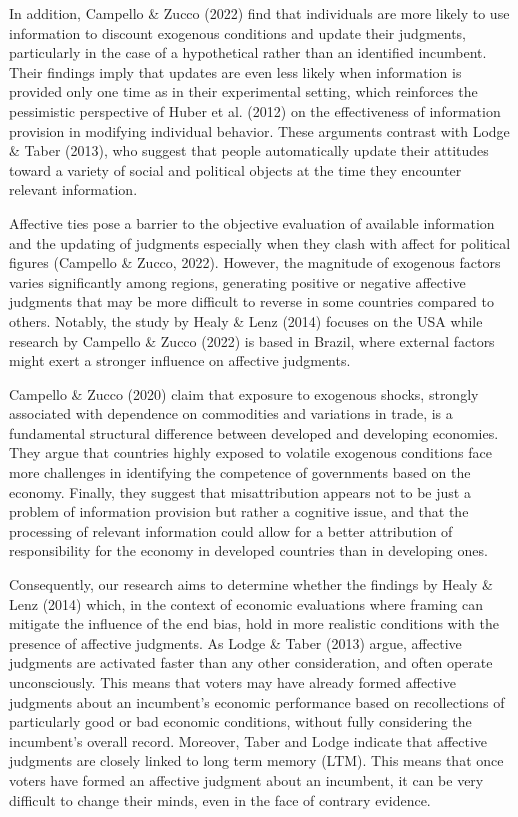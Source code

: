 \documentclass[
]{article}
\begin{document}
In addition, Campello \& Zucco (2022) find that individuals are more
likely to use information to discount exogenous conditions and update
their judgments, particularly in the case of a hypothetical rather than
an identified incumbent. Their findings imply that updates are even less
likely when information is provided only one time as in their
experimental setting, which reinforces the pessimistic perspective of
Huber et al. (2012) on the effectiveness of information provision in
modifying individual behavior. These arguments contrast with Lodge \&
Taber (2013), who suggest that people automatically update their
attitudes toward a variety of social and political objects at the time
they encounter relevant information.

Affective ties pose a barrier to the objective evaluation of available
information and the updating of judgments especially when they clash
with affect for political figures (Campello \& Zucco, 2022). However,
the magnitude of exogenous factors varies significantly among regions,
generating positive or negative affective judgments that may be more
difficult to reverse in some countries compared to others. Notably, the
study by Healy \& Lenz (2014) focuses on the USA while research by
Campello \& Zucco (2022) is based in Brazil, where external factors
might exert a stronger influence on affective judgments.

Campello \& Zucco (2020) claim that exposure to exogenous shocks,
strongly associated with dependence on commodities and variations in
trade, is a fundamental structural difference between developed and
developing economies. They argue that countries highly exposed to
volatile exogenous conditions face more challenges in identifying the
competence of governments based on the economy. Finally, they suggest
that misattribution appears not to be just a problem of information
provision but rather a cognitive issue, and that the processing of
relevant information could allow for a better attribution of
responsibility for the economy in developed countries than in developing
ones.

Consequently, our research aims to determine whether the findings by
Healy \& Lenz (2014) which, in the context of economic evaluations where
framing can mitigate the influence of the end bias, hold in more
realistic conditions with the presence of affective judgments. As Lodge
\& Taber (2013) argue, affective judgments are activated faster than any
other consideration, and often operate unconsciously. This means that
voters may have already formed affective judgments about an incumbent's
economic performance based on recollections of particularly good or bad
economic conditions, without fully considering the incumbent's overall
record. Moreover, Taber and Lodge indicate that affective judgments are
closely linked to long term memory (LTM). This means that once voters
have formed an affective judgment about an incumbent, it can be very
difficult to change their minds, even in the face of contrary evidence.
\end{document}
